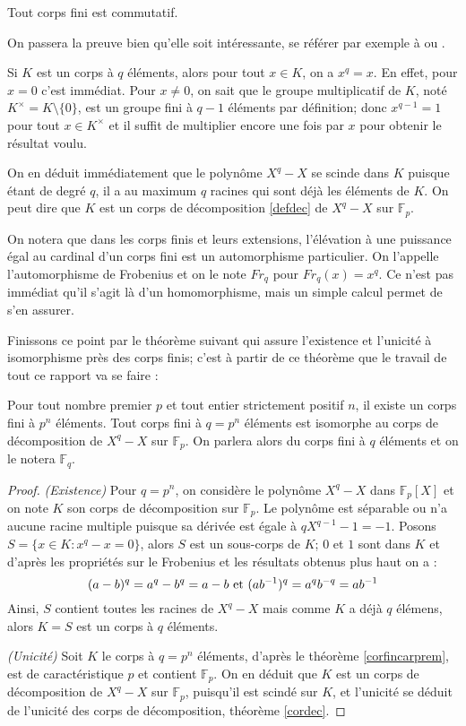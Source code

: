 \documentclass[a4paper]{article} %
\numberwithin{equation}{section}
\newcommand\GF[1]{\mathbb{F}_{#1}}
\begin{document}
\begin{thm}[Wedderburn]
Tout corps fini est commutatif.
\end{thm}
On passera la preuve bien qu'elle soit intéressante, se référer par exemple à 
\cite[p.~70-73]{LiNi} ou \cite[p.~82]{Per}.\par
\vspace{0.3cm}
Si $K$ est un corps à $q$ éléments, alors pour tout $x\in K$, on a $x^q = x$. En
effet, pour $x = 0$ c'est immédiat. Pour $x\neq 0$, on sait que le groupe
multiplicatif de $K$, noté $K^{\times} = K\setminus\lbrace0\rbrace$, est un
groupe fini à $q-1$ éléments par définition; donc $x^{q-1} = 1$ pour tout $x\in
K^{\times}$ et il suffit de multiplier encore une fois par $x$ pour obtenir le
résultat voulu.\par
On en déduit immédiatement que le polynôme $X^q - X$ se scinde dans $K$
puisque étant de degré $q$, il a au maximum $q$ racines qui sont déjà les
éléments de $K$. On peut dire que $K$ est un corps de décomposition
\ref{defdec} de $X^q - X$ sur $\GF{p}$.\par
On notera que dans les corps finis et leurs extensions, l'élévation à une
puissance égal au cardinal d'un corps fini est un automorphisme particulier. On
l'appelle l'automorphisme de Frobenius et on le note $Fr_q$ pour $Fr_q(x) =
x^q$. Ce n'est pas immédiat qu'il s'agit là d'un homomorphisme, mais un simple
calcul permet de s'en assurer.\par
\vspace{0.3cm}
Finissons ce point par le théorème suivant qui assure l'existence et l'unicité
à isomorphisme près des corps finis; c'est à partir de ce théorème que le
travail de tout ce rapport va se faire :

\begin{thm}
\label{thisomGF}
Pour tout nombre premier $p$ et tout entier strictement positif $n$, il existe 
un corps fini à $p^n$ éléments. Tout corps fini à $q = p^n$ éléments est 
isomorphe au corps de décomposition de $X^q - X$ sur $\GF{p}$. On parlera alors 
du corps fini à $q$ éléments et on le notera $\GF{q}$.
\end{thm}
\begin{proof}
\textit{(Existence)} Pour $q = p^n$, on considère le polynôme $X^q - X$ dans 
$\GF{p}[X]$ et on note $K$ son corps de décomposition sur $\GF{p}$. Le polynôme 
est séparable ou n'a aucune racine multiple puisque sa dérivée est égale à 
$qX^{q-1} - 1 = -1$. Posons $S = \lbrace x\in K : x^q - x = 0\rbrace$, alors $S$
est un sous-corps de $K$; $0$ et $1$ sont dans $K$ et d'après les propriétés sur
le Frobenius et les résultats obtenus plus haut on a :
\[(a - b)^q = a^q - b^q = a - b \textup{ et }(ab^{-1})^q = a^qb^{-q} = ab^{-1}\]
Ainsi, $S$ contient toutes les racines de $X^q - X$ mais comme $K$ a déjà $q$
élémens, alors $K = S$ est un corps à $q$ éléments.\par
\textit{(Unicité)} Soit $K$ le corps à $q = p^n$ éléments, d'après le théorème
\ref{corfincarprem}, est de caractéristique $p$ et contient $\GF{p}$. On en
déduit que $K$ est un corps de décomposition de $X^q - X$ sur $\GF{p}$,
puisqu'il est scindé sur $K$, et l'unicité se déduit de l'unicité des corps de
décomposition, théorème \ref{cordec}.
\end{proof}
\end{document}
